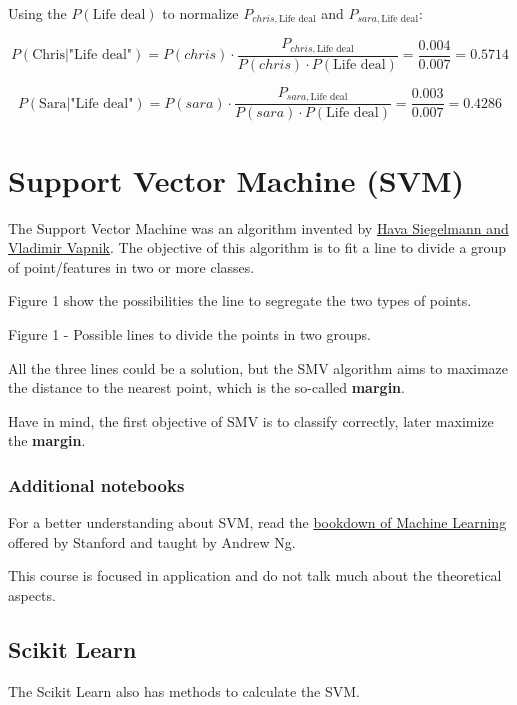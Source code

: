 \documentclass[]{book}
\begin{document}
Using the \(P(\text{Life deal})\) to normalize
\(P_{chris,\text{Life deal}}\) and \(P_{sara,\text{Life deal}}\):

\[P(\text{Chris|"Life deal"}) = P(chris) \cdot \frac{P_{chris,\text{Life deal}}}{P(chris) \cdot P(\text{Life deal})} = \frac{0.004}{0.007} = 0.5714\]

\[P(\text{Sara|"Life deal"}) = P(sara) \cdot \frac{P_{sara,\text{Life deal}}}{P(sara) \cdot P(\text{Life deal})} = \frac{0.003}{0.007} = 0.4286\]

\section{Support Vector Machine (SVM)}\label{support-vector-machine-svm}

The Support Vector Machine was an algorithm invented by
\href{https://en.wikipedia.org/wiki/Support-vector_machine}{Hava
Siegelmann and Vladimir Vapnik}. The objective of this algorithm is to
fit a line to divide a group of point/features in two or more classes.

Figure 1 show the possibilities the line to segregate the two types of
points.

Figure 1 - Possible lines to divide the points in two groups.

All the three lines could be a solution, but the SMV algorithm aims to
maximaze the distance to the nearest point, which is the so-called
\textbf{margin}.

Have in mind, the first objective of SMV is to classify correctly, later
maximize the \textbf{margin}.

\subsubsection*{Additional notebooks}\label{additional-notebooks}

For a better understanding about SVM, read the \href{a}{bookdown of
Machine Learning} offered by Stanford and taught by Andrew Ng.

This course is focused in application and do not talk much about the
theoretical aspects.

\subsection{Scikit Learn}\label{scikit-learn-1}

The Scikit Learn also has methods to calculate the SVM.
\end{document}
